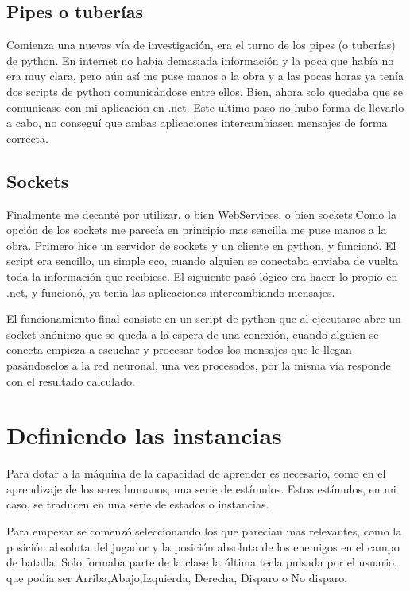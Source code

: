 \subsection{Pipes o tuberías}
Comienza una nuevas vía de investigación, era el turno de los pipes (o tuberías) de python. En internet no había demasiada información y la poca que había no era muy clara, pero aún así me puse manos a la obra y a las pocas horas ya tenía dos scripts de python comunicándose entre ellos. Bien, ahora solo quedaba que se comunicase con mi aplicación en .net. Este ultimo paso no hubo forma de llevarlo a cabo, no conseguí que ambas aplicaciones intercambiasen mensajes de forma correcta.

\subsection{Sockets}
Finalmente me decanté por utilizar, o bien WebServices, o bien sockets.Como la opción de los sockets me parecía en principio mas sencilla me puse manos a la obra. Primero hice un servidor de sockets y un cliente en python, y funcionó. El script era sencillo, un simple eco, cuando alguien se conectaba enviaba de vuelta toda la información que recibiese. El siguiente pasó lógico era hacer lo propio en .net, y funcionó, ya tenía las aplicaciones intercambiando mensajes.

El funcionamiento final consiste en un script de python que al ejecutarse abre un socket anónimo que se queda a la espera de una conexión, cuando alguien se conecta empieza a escuchar y procesar todos los mensajes que le llegan pasándoselos a la red neuronal, una vez procesados, por la misma vía responde con el resultado calculado.


\section{Definiendo las instancias}

Para dotar a la máquina de la capacidad de aprender es necesario, como en el aprendizaje de los seres humanos, una serie de estímulos. Estos estímulos, en mi caso, se traducen en una serie de estados o instancias.

Para empezar se comenzó seleccionando los que parecían mas relevantes, como la posición absoluta del jugador y la posición absoluta de los enemigos  en el campo de batalla. Solo formaba parte de la clase la última tecla pulsada por el usuario, que podía ser Arriba,Abajo,Izquierda, Derecha, Disparo o No disparo.

